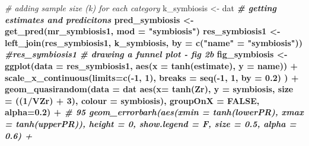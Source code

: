 \documentclass[
]{article}
\newenvironment{Shaded}{\begin{snugshade}}{\end{snugshade}}
\newcommand{\CommentTok}[1]{\textcolor[rgb]{0.56,0.35,0.01}{\textit{#1}}}
\newcommand{\DataTypeTok}[1]{\textcolor[rgb]{0.13,0.29,0.53}{#1}}
\newcommand{\DecValTok}[1]{\textcolor[rgb]{0.00,0.00,0.81}{#1}}
\newcommand{\FloatTok}[1]{\textcolor[rgb]{0.00,0.00,0.81}{#1}}
\newcommand{\KeywordTok}[1]{\textcolor[rgb]{0.13,0.29,0.53}{\textbf{#1}}}
\newcommand{\NormalTok}[1]{#1}
\newcommand{\OperatorTok}[1]{\textcolor[rgb]{0.81,0.36,0.00}{\textbf{#1}}}
\newcommand{\OtherTok}[1]{\textcolor[rgb]{0.56,0.35,0.01}{#1}}
\newcommand{\StringTok}[1]{\textcolor[rgb]{0.31,0.60,0.02}{#1}}
\begin{document}
\begin{Shaded}
\begin{Highlighting}[]
\CommentTok{# adding sample size (k) for each category}
\NormalTok{k_symbiosis <-}\StringTok{ }\NormalTok{dat }\OperatorTok{%
\CommentTok{# getting estimates and predicitons}
\NormalTok{pred_symbiosis <-}\StringTok{ }\KeywordTok{get_pred}\NormalTok{(mr_symbiosis1, }\DataTypeTok{mod =} \StringTok{"symbiosis"}\NormalTok{) }
\NormalTok{res_symbiosis1 <-}\StringTok{ }\KeywordTok{left_join}\NormalTok{(res_symbiosis1, k_symbiosis, }\DataTypeTok{by =}  \KeywordTok{c}\NormalTok{(}\StringTok{"name"}\NormalTok{ =}\StringTok{ "symbiosis"}\NormalTok{))  }\OperatorTok{%
\CommentTok{#res_symbiosis1 }
\CommentTok{# drawing a funnel plot - fig 2b}
\NormalTok{fig_symbiosis <-}\StringTok{ }\KeywordTok{ggplot}\NormalTok{(}\DataTypeTok{data =}\NormalTok{ res_symbiosis1, }\KeywordTok{aes}\NormalTok{(}\DataTypeTok{x =} \KeywordTok{tanh}\NormalTok{(estimate), }\DataTypeTok{y =}\NormalTok{ name)) }\OperatorTok{+}
\StringTok{  }\KeywordTok{scale_x_continuous}\NormalTok{(}\DataTypeTok{limits=}\KeywordTok{c}\NormalTok{(}\OperatorTok{-}\DecValTok{1}\NormalTok{, }\DecValTok{1}\NormalTok{), }\DataTypeTok{breaks =} \KeywordTok{seq}\NormalTok{(}\OperatorTok{-}\DecValTok{1}\NormalTok{, }\DecValTok{1}\NormalTok{, }\DataTypeTok{by =} \FloatTok{0.2}\NormalTok{) ) }\OperatorTok{+}
\StringTok{  }\KeywordTok{geom_quasirandom}\NormalTok{(}\DataTypeTok{data =}\NormalTok{ dat }\OperatorTok{%
                   \KeywordTok{aes}\NormalTok{(}\DataTypeTok{x=} \KeywordTok{tanh}\NormalTok{(Zr), }\DataTypeTok{y =}\NormalTok{ symbiosis, }\DataTypeTok{size =}\NormalTok{ ((}\DecValTok{1}\OperatorTok{/}\NormalTok{VZr) }\OperatorTok{+}\StringTok{ }\DecValTok{3}\NormalTok{), }\DataTypeTok{colour =}\NormalTok{ symbiosis), }\DataTypeTok{groupOnX =} \OtherTok{FALSE}\NormalTok{, }\DataTypeTok{alpha=}\FloatTok{0.2}\NormalTok{) }\OperatorTok{+}\StringTok{ }
\StringTok{  }\CommentTok{# 95 %
\StringTok{  }\KeywordTok{geom_errorbarh}\NormalTok{(}\KeywordTok{aes}\NormalTok{(}\DataTypeTok{xmin =} \KeywordTok{tanh}\NormalTok{(lowerPR), }\DataTypeTok{xmax =} \KeywordTok{tanh}\NormalTok{(upperPR)),  }\DataTypeTok{height =} \DecValTok{0}\NormalTok{, }\DataTypeTok{show.legend =}\NormalTok{ F, }\DataTypeTok{size =} \FloatTok{0.5}\NormalTok{, }\DataTypeTok{alpha =} \FloatTok{0.6}\NormalTok{) }\OperatorTok{+}
}}}}
\end{Highlighting}
\end{Shaded}
\end{document}
